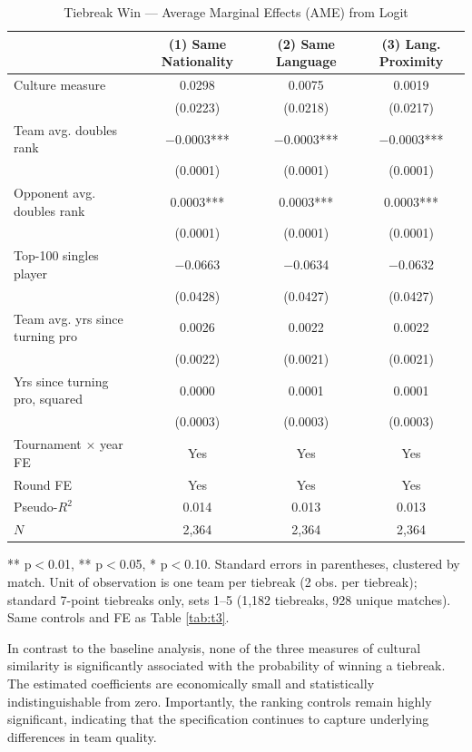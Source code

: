 \documentclass[10pt]{article}
\begin{document}
\begin{table}[htbp]
\color{blue}
\centering
\caption{Tiebreak Win — Average Marginal Effects (AME) from Logit \label{tab:t4}}
\begin{threeparttable}
\begin{tabular}{lccc}
\toprule
 & (1) Same Nationality & (2) Same Language & (3) Lang. Proximity \\
\midrule
Culture measure & 0.0298 & 0.0075 & 0.0019 \\
 & (0.0223) & (0.0218) & (0.0217) \\
Team avg. doubles rank & $-$0.0003*** & $-$0.0003*** & $-$0.0003*** \\
 & (0.0001) & (0.0001) & (0.0001) \\
Opponent avg. doubles rank & 0.0003*** & 0.0003*** & 0.0003*** \\
 & (0.0001) & (0.0001) & (0.0001) \\
Top-100 singles player & $-$0.0663 & $-$0.0634 & $-$0.0632 \\
 & (0.0428) & (0.0427) & (0.0427) \\
Team avg. yrs since turning pro & 0.0026 & 0.0022 & 0.0022 \\
 & (0.0022) & (0.0021) & (0.0021) \\
Yrs since turning pro, squared & 0.0000 & 0.0001 & 0.0001 \\
 & (0.0003) & (0.0003) & (0.0003) \\
\midrule
Tournament $\times$ year FE & Yes & Yes & Yes \\
Round FE & Yes & Yes & Yes \\
Pseudo-$R^2$ & 0.014 & 0.013 & 0.013 \\
$N$ & 2,364 & 2,364 & 2,364 \\
\bottomrule
\end{tabular}
\begin{tablenotes}
\small
\item *** p$<$0.01, ** p$<$0.05, * p$<$0.10. Standard errors in parentheses, clustered by match. Unit of observation is one team per tiebreak (2 obs. per tiebreak); standard 7-point tiebreaks only, sets 1--5 (1,182 tiebreaks, 928 unique matches). Same controls and FE as Table \ref{tab:t3}.
\end{tablenotes}
\end{threeparttable}
\end{table}
\FloatBarrier

In contrast to the baseline analysis, none of the three measures of cultural similarity is significantly associated with the probability of winning a tiebreak. The estimated coefficients are economically small and statistically indistinguishable from zero. Importantly, the ranking controls remain highly significant, indicating that the specification continues to capture underlying differences in team quality.
\end{document}
